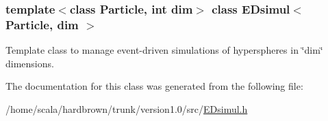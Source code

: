 \subsubsection*{template$<$class Particle, int dim$>$ class EDsimul$<$ Particle, dim $>$}

Template class to manage event-driven simulations of hyperspheres in \char`\"{}dim\char`\"{} dimensions. 

The documentation for this class was generated from the following file:\begin{CompactItemize}
\item 
/home/scala/hardbrown/trunk/version1.0/src/\hyperlink{EDsimul_8h}{EDsimul.h}\end{CompactItemize}
